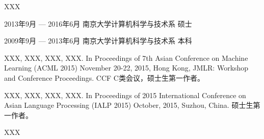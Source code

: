 \documentclass[master]{njuthesis}
\begin{document}
\begin{acknowledgement}


\end{acknowledgement}



\nocite{*}

%
%


\backmatter
\begin{resume}
\begin{authorinfo}
\noindent XXX
\end{authorinfo}
\begin{education}
\item[2013年9月 --- 2016年6月] 南京大学计算机科学与技术系 \hfill 硕士
\item[2009年9月 --- 2013年6月] 南京大学计算机科学与技术系 \hfill 本科
\end{education}
\begin{publications}
\item XXX, XXX, XXX, XXX. In Proceedings of 7th Asian Conference on Machine Learning (ACML 2015) November 20-22, 2015, Hong Kong, JMLR: Workshop and Conference Proceedings. CCF C类会议，硕士生第一作者。
\item XXX, XXX, XXX, XXX. In Proceedings of 2015 International Conference on Asian Language Processing (IALP 2015) October, 2015, Suzhou, China. 硕士生第一作者。
\end{publications}
\begin{projects}
\item XXX
\end{projects}
\end{resume}

\makelicense


\end{document}
